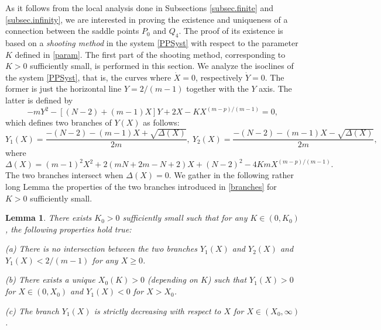 \documentclass[a4paper,11pt]{article}
\newtheorem{lemma}[theorem]{Lemma}
\numberwithin{equation}{section}
\begin{document}
As it follows from the local analysis done in Subsections \ref{subsec.finite} and \ref{subsec.infinity}, we are interested in proving the existence and uniqueness of a connection between the saddle points $P_0$ and $Q_4$. The proof of its existence is based on a \emph{shooting method} in the system \eqref{PPSyst} with respect to the parameter $K$ defined in \eqref{param}. The first part of the shooting method, corresponding to $K>0$ sufficiently small, is performed in this section. We analyze the isoclines of the system \eqref{PPSyst}, that is, the curves where $\dot{X}=0$, respectively $\dot{Y}=0$. The former is just the horizontal line $Y=2/(m-1)$ together with the $Y$ axis. The latter is defined by
$$
-mY^2-[(N-2)+(m-1)X]Y+2X-KX^{(m-p)/(m-1)}=0,
$$
which defines two branches of $Y(X)$ as follows:
\begin{equation}\label{branches}
Y_1(X)=\frac{-(N-2)-(m-1)X+\sqrt{\Delta(X)}}{2m}, \ Y_2(X)=\frac{-(N-2)-(m-1)X-\sqrt{\Delta(X)}}{2m},
\end{equation}
where
\begin{equation}\label{delta}
\Delta(X)=(m-1)^2X^2+2(mN+2m-N+2)X+(N-2)^2-4KmX^{(m-p)/(m-1)}.
\end{equation}
The two branches intersect when $\Delta(X)=0$. We gather in the following rather long Lemma the properties of the two branches introduced in \eqref{branches} for $K>0$ sufficiently small.
\begin{lemma}\label{lem.small}
There exists $K_0>0$ sufficiently small such that for any $K\in(0,K_0)$, the following properties hold true:

(a) There is no intersection between the two branches $Y_1(X)$ and $Y_2(X)$ and $Y_1(X)<2/(m-1)$ for any $X\geq0$.

(b) There exists a unique $X_0(K)>0$ (depending on $K$) such that $Y_1(X)>0$ for $X\in(0,X_0)$ and $Y_1(X)<0$ for $X>X_0$.

(c) The branch $Y_1(X)$ is strictly decreasing with respect to $X$ for $X\in(X_0,\infty)$.
\end{lemma}
\end{document}
